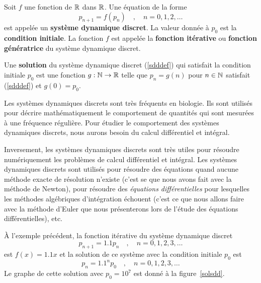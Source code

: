 {\begin{defn}
Soit $f$ une fonction de $\mathbb{R}$ dans $\mathbb{R}$.  Une équation de la forme
\begin{equation} \label{sdddef}
p_{n+1} = f(p_n) \quad , \quad n=0, 1, 2, \ldots
\end{equation}
est appelée un {\bfseries système dynamique discret}.
  La valeur donnée à $p_0$ est la
{\bfseries condition initiale}.
  La fonction $f$
est appelée la {\bfseries fonction itérative} ou
{\bfseries fonction génératrice} du système dynamique
discret.

Une {\bfseries solution} du système dynamique discret (\ref{sdddef})
qui satisfait la condition initiale $p_0$ est une fonction
$g:\mathbb{N} \rightarrow \mathbb{R}$ telle que $p_n = g(n)$ pour $n\in \mathbb{N}$
satisfait (\ref{sdddef}) et $g(0) = p_0$.
\end{defn}

\begin{rmk}
Les systèmes dynamiques discrets sont très fréquents en biologie.  Ils
sont utilisés pour décrire mathématiquement le comportement de
quantités qui sont mesurées à une fréquence régulière.  Pour étudier
le comportement des systèmes dynamiques discrets, nous aurons besoin du
calcul différentiel et intégral.

Inversement, les systèmes dynamiques discrets sont très utiles pour
résoudre numéri\-que\-ment les problèmes de calcul différentiel et
intégral.  Les systèmes dynamiques discrets sont utilisés pour
résoudre des équations quand aucune méthode exacte de résolution
n'existe (c'est se que nous avons fait avec la méthode de Newton),
pour résoudre des {\em équations différentielles} pour lesquelles les
méthodes algébriques d'intégration échouent (c'est ce que nous allons
faire avec la méthode d'Euler que nous présenterons
lors de l'étude des équations différentielles), etc.
\end{rmk}

\begin{egg}
À l'exemple précédent, la fonction itérative du système dynamique
discret
\[
p_{n+1} = 1.1 p_n \quad , \quad n=0,1,2,3,\ldots
\]
est $f(x) = 1.1x$ et la solution de ce système avec la condition
initiale $p_0$ est
\[
p_n = 1.1^n p_0 \quad , \quad n=0,1,2,3,\ldots 
\]
Le graphe de cette solution avec $p_0 = 10^7$ est donné à la
figure~\ref{solsdd}.
\end{egg}

}
